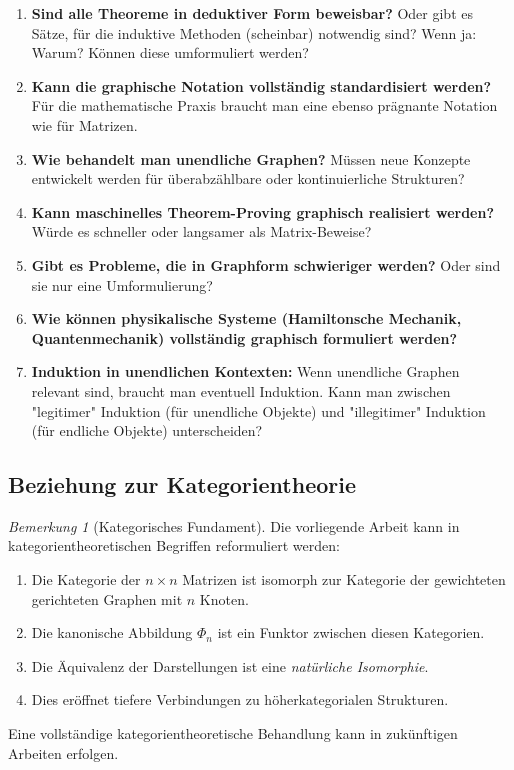 \documentclass[12pt, a4paper]{article}
\theoremstyle{definition}
\theoremstyle{remark}
\newtheorem{remark}[theorem]{Bemerkung}
\begin{document}
\begin{enumerate}[label=(\roman*)]
  \item \textbf{Sind alle Theoreme in deduktiver Form beweisbar?} Oder gibt es Sätze, für die induktive Methoden (scheinbar) notwendig sind? Wenn ja: Warum? Können diese umformuliert werden?
  
  \item \textbf{Kann die graphische Notation vollständig standardisiert werden?} Für die mathematische Praxis braucht man eine ebenso prägnante Notation wie für Matrizen.
  
  \item \textbf{Wie behandelt man unendliche Graphen?} Müssen neue Konzepte entwickelt werden für überabzählbare oder kontinuierliche Strukturen?
  
  \item \textbf{Kann maschinelles Theorem-Proving graphisch realisiert werden?} Würde es schneller oder langsamer als Matrix-Beweise?
  
  \item \textbf{Gibt es Probleme, die in Graphform schwieriger werden?} Oder sind sie nur eine Umformulierung?
  
  \item \textbf{Wie können physikalische Systeme (Hamiltonsche Mechanik, Quantenmechanik) vollständig graphisch formuliert werden?}
  
  \item \textbf{Induktion in unendlichen Kontexten:} Wenn unendliche Graphen relevant sind, braucht man eventuell Induktion. Kann man zwischen "legitimer" Induktion (für unendliche Objekte) und "illegitimer" Induktion (für endliche Objekte) unterscheiden?
\end{enumerate}

\subsection{Beziehung zur Kategorientheorie}
\label{subsec:kategorientheorie}

\begin{remark}[Kategorisches Fundament]
\label{rem:kategorisches_fundament}
Die vorliegende Arbeit kann in kategorientheoretischen Begriffen reformuliert werden:

\begin{enumerate}[label=(\alph*)]
  \item Die Kategorie der $n \times n$ Matrizen ist isomorph zur Kategorie der gewichteten gerichteten Graphen mit $n$ Knoten.
  
  \item Die kanonische Abbildung $\Phi_n$ ist ein Funktor zwischen diesen Kategorien.
  
  \item Die Äquivalenz der Darstellungen ist eine \emph{natürliche Isomorphie}.
  
  \item Dies eröffnet tiefere Verbindungen zu höherkategorialen Strukturen.
\end{enumerate}

Eine vollständige kategorientheoretische Behandlung kann in zukünftigen Arbeiten erfolgen.
\end{remark}
\end{document}
